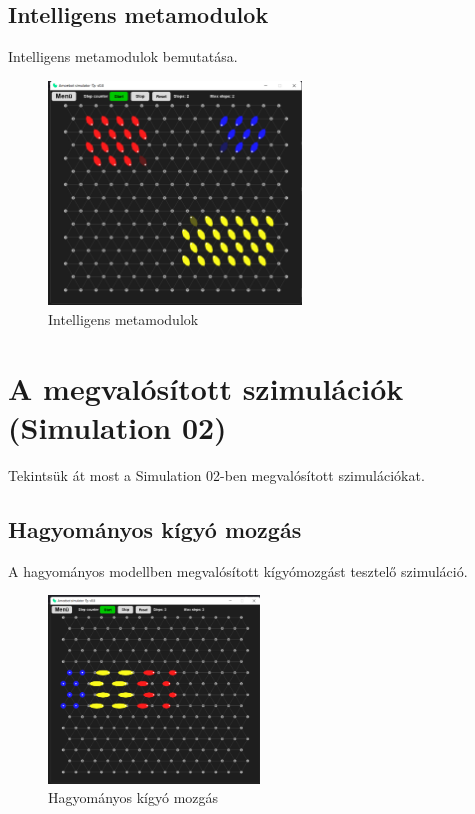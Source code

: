 \documentclass[	
  noindent
]{elteikthesis}[2024/04/26]
\begin{document}
      \subsection{Intelligens metamodulok}
        Intelligens metamodulok bemutatása.
      \begin{figure}[H]
      \centering
      \includegraphics[width=0.6\textwidth]{images/simulatons/06_meta.png}
      \caption{Intelligens metamodulok}
      \label{fig:06_meta}
      \end{figure}

    \section{A megvalósított szimulációk (Simulation 02)}
      Tekintsük át most a Simulation 02-ben megvalósított szimulációkat.

      \subsection{Hagyományos kígyó mozgás}
        A hagyományos modellben megvalósított kígyómozgást tesztelő szimuláció.
      \begin{figure}[H]
      \centering
      \includegraphics[width=0.5\textwidth]{images/simulatons/07_snake.png}
      \caption{Hagyományos kígyó mozgás}
      \label{fig:07_snake}
      \end{figure}
\end{document}

